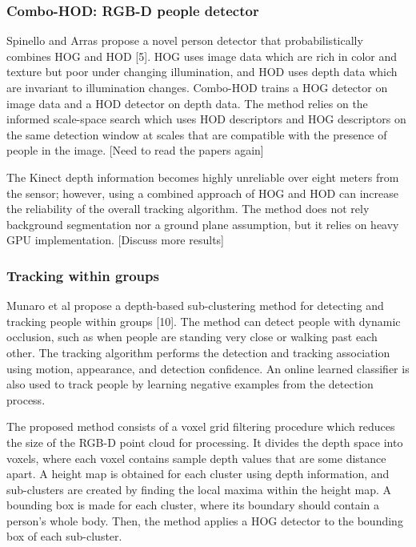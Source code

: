\documentclass[paper=a4, fontsize=11pt]{scrartcl}
\numberwithin{equation}{section}		%
\numberwithin{figure}{section}			%
\numberwithin{table}{section}				%
\begin{document}
\subsubsection{Combo-HOD: RGB-D people detector}

Spinello and Arras propose a novel person detector that probabilistically combines HOG and HOD [5]. HOG uses image data which are rich in color and texture but poor under changing illumination, and HOD uses depth data which are invariant to illumination changes. Combo-HOD trains a HOG detector on image data and a HOD detector on depth data. The method relies on the informed scale-space search which uses HOD descriptors and HOG descriptors on the same detection window at scales that are compatible with the presence of people in the image. [Need to read the papers again]

The Kinect depth information becomes highly unreliable over eight meters from the sensor; however, using a combined approach of HOG and HOD can increase the reliability of the overall tracking algorithm. The method does not rely background segmentation nor a ground plane assumption, but it relies on heavy GPU implementation. [Discuss more results]

\subsubsection{Tracking within groups}

Munaro et al propose a depth-based sub-clustering method for detecting and tracking people within groups [10]. The method can detect people with dynamic occlusion, such as when people are standing very close or walking past each other. The tracking algorithm performs the detection and tracking association using motion, appearance, and detection confidence. An online learned classifier is also used to track people by learning negative examples from the detection process.

The proposed method consists of a voxel grid filtering procedure which reduces the size of the RGB-D point cloud for processing. It divides the depth space into voxels, where each voxel contains sample depth values that are some distance apart. A height map is obtained for each cluster using depth information, and sub-clusters are created by finding the local maxima within the height map. A bounding box is made for each cluster, where its boundary should contain a person's whole body. Then, the method applies a HOG detector to the bounding box of each sub-cluster.
\end{document}
